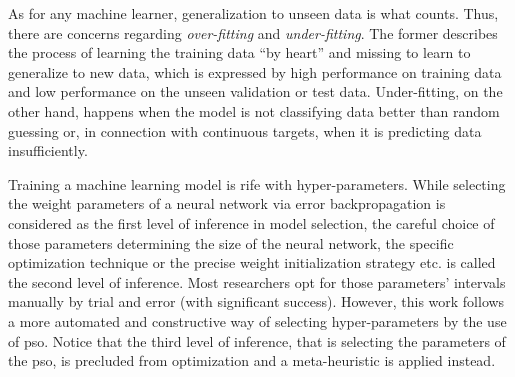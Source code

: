 As for any machine learner, generalization to unseen data is what counts.
Thus, there are concerns regarding \textit{over-fitting} and \textit{under-fitting}.
The former describes the process of learning the training data ``by heart'' and missing to learn to generalize to new data, which is expressed by high performance on training data and low performance on the unseen validation or test data.
Under-fitting, on the other hand, happens when the model is not classifying data better than random guessing or, in connection with continuous targets, when it is predicting data insufficiently. 

Training a machine learning model is rife with hyper-parameters.
While selecting the weight parameters of a neural network via error backpropagation is considered as the first level of inference in model selection, the careful choice of those parameters determining the size of the neural network, the specific optimization technique or the precise weight initialization strategy etc. is called the second level of inference.
Most researchers opt for those parameters' intervals manually by trial and error (with significant success).
However, this work follows a more automated and constructive way of selecting hyper-parameters by the use of \gls{pso}.
Notice that the third level of inference, that is selecting the parameters of the \gls{pso}, is precluded from optimization and a meta-heuristic is applied instead. 

%
